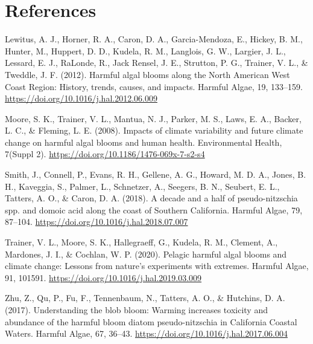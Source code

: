 \documentclass[
  12pt,
]{article}
\begin{document}
\hypertarget{references}{%
\section{References}\label{references}}

Lewitus, A. J., Horner, R. A., Caron, D. A., Garcia-Mendoza, E., Hickey,
B. M., Hunter, M., Huppert, D. D., Kudela, R. M., Langlois, G. W.,
Largier, J. L., Lessard, E. J., RaLonde, R., Jack Rensel, J. E.,
Strutton, P. G., Trainer, V. L., \& Tweddle, J. F. (2012). Harmful algal
blooms along the North American West Coast Region: History, trends,
causes, and impacts. Harmful Algae, 19, 133--159.
\url{https://doi.org/10.1016/j.hal.2012.06.009}

Moore, S. K., Trainer, V. L., Mantua, N. J., Parker, M. S., Laws, E. A.,
Backer, L. C., \& Fleming, L. E. (2008). Impacts of climate variability
and future climate change on harmful algal blooms and human health.
Environmental Health, 7(Suppl 2).
\url{https://doi.org/10.1186/1476-069x-7-s2-s4}

Smith, J., Connell, P., Evans, R. H., Gellene, A. G., Howard, M. D. A.,
Jones, B. H., Kaveggia, S., Palmer, L., Schnetzer, A., Seegers, B. N.,
Seubert, E. L., Tatters, A. O., \& Caron, D. A. (2018). A decade and a
half of pseudo-nitzschia spp. and domoic acid along the coast of
Southern California. Harmful Algae, 79, 87--104.
\url{https://doi.org/10.1016/j.hal.2018.07.007}

Trainer, V. L., Moore, S. K., Hallegraeff, G., Kudela, R. M., Clement,
A., Mardones, J. I., \& Cochlan, W. P. (2020). Pelagic harmful algal
blooms and climate change: Lessons from nature's experiments with
extremes. Harmful Algae, 91, 101591.
\url{https://doi.org/10.1016/j.hal.2019.03.009}

Zhu, Z., Qu, P., Fu, F., Tennenbaum, N., Tatters, A. O., \& Hutchins, D.
A. (2017). Understanding the blob bloom: Warming increases toxicity and
abundance of the harmful bloom diatom pseudo-nitzschia in California
Coastal Waters. Harmful Algae, 67, 36--43.
\url{https://doi.org/10.1016/j.hal.2017.06.004}
\end{document}
